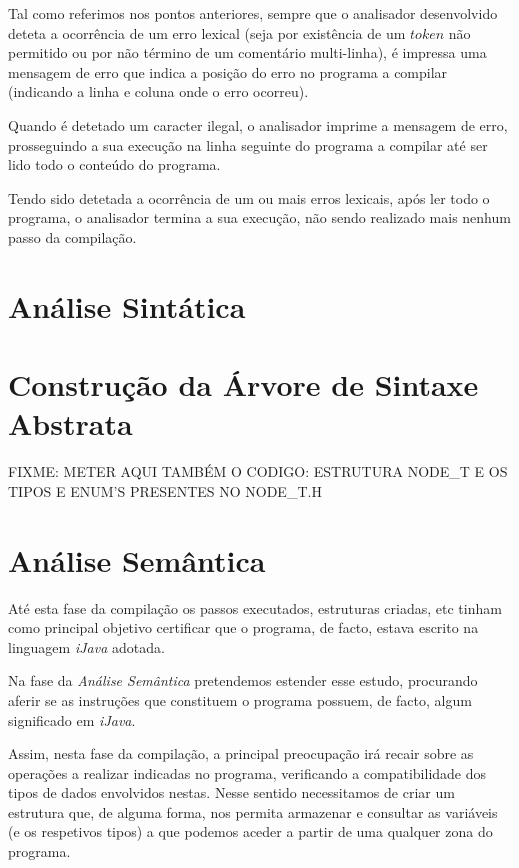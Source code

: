 \documentclass[11pt,a4paper]{article}
\begin{document}
	Tal como referimos nos pontos anteriores, sempre que o analisador desenvolvido deteta a ocorrência de um erro lexical (seja por existência de um $token$ não permitido ou por não término de um comentário multi-linha), é impressa uma mensagem de erro que indica a posição do erro no programa a compilar (indicando a linha e coluna onde o erro ocorreu).
	
	Quando é detetado um caracter ilegal, o analisador imprime a mensagem de erro, prosseguindo a sua execução na linha seguinte do programa a compilar até ser lido todo o conteúdo do programa.
	
	Tendo sido detetada a ocorrência de um ou mais erros lexicais, após ler todo o programa, o analisador termina a sua execução, não sendo realizado mais nenhum passo da compilação.


\pagebreak

\section{Análise Sintática}

\pagebreak

\section{Construção da Árvore de Sintaxe Abstrata}

FIXME: METER AQUI TAMBÉM O CODIGO: ESTRUTURA NODE\_T E OS TIPOS E ENUM'S PRESENTES NO NODE\_T.H

\pagebreak

\section{Análise Semântica}

	Até esta fase da compilação os passos executados, estruturas criadas, etc tinham como principal objetivo certificar que o programa, de facto, estava escrito na linguagem \emph{iJava} adotada.
	
	Na fase da \emph{Análise Semântica} pretendemos estender esse estudo, procurando aferir se as instruções que constituem o programa possuem, de facto, algum significado em \emph{iJava}.
	
	Assim, nesta fase da compilação, a principal preocupação irá recair sobre as operações a realizar indicadas no programa, verificando a compatibilidade dos tipos de dados envolvidos nestas. Nesse sentido necessitamos de criar um estrutura que, de alguma forma, nos permita armazenar e consultar as variáveis (e os respetivos tipos) a que podemos aceder a partir de uma qualquer zona do programa.
	
\end{document}
